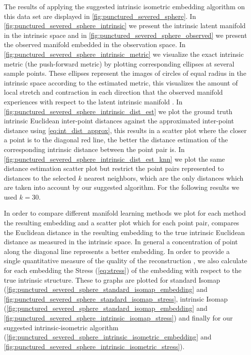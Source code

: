 	The results of applying the suggested intrinsic isometric embedding algorithm on this data set are displayed in \cref{fig:punctured_severed_sphere}. In \cref{fig:punctured_severed_sphere_intrinsic} we present the intrinsic latent manifold in the intrinsic space and in \cref{fig:punctured_severed_sphere_observed} we present the observed manifold embedded in the observation space. In \cref{fig:punctured_severed_sphere_intrinsic_metric} we visualize the exact intrinsic metric (the push-forward metric) by plotting corresponding ellipses at several sample points. These  ellipses represent the images of circles of equal radius in the intrinsic space according to the estimated metric, this visualizes the amount of local stretch and contraction in each direction that the observed manifold experiences with respect to the latent intrinsic manifold . In \cref{fig:punctured_severed_sphere_intrinsic_dist_est} we plot the ground truth intrinsic Euclidean inter-point distances against the approximated inter-point distance using \cref{eq:int_dist_approx}, this results in a scatter plot where the closer a point is to the diagonal red line, the better the distance estimation of the corresponding intrinsic distance between the point pair is. In \cref{fig:punctured_severed_sphere_intrinsic_dist_est_knn} we plot the same distance estimation scatter plot but restrict the point pairs represented to distances to the selected $k$ nearest neighbors, which are the only distances which are taken into account by our suggested algorithm. For the following results we used $k=30$. 
	
	In order to compare different manifold learning methods we plot for each method the resulting embedding and a scatter plot which for each point pair, compares the Euclidean distance in the resulting embedding to the true intrinsic Euclidean distance as measured in the intrinsic space. In general a concentration of point along the diagonal line represents a better embedding. In order to provide a single quantitative measure of the quality of the reconstruction , we also calculate for each embedding the Stress (\cref{eq:stress}) of the embedding with respect to the true intrinsic structure. These to graphs are plotted for standard Isomap (\cref{fig:punctured_severed_sphere_standard_isomap_embedding} and \cref{fig:punctured_severed_sphere_standard_isomap_stress}, intrinsic Isomap (\cref{fig:punctured_severed_sphere_standard_isomap_embedding} and \cref{fig:punctured_severed_sphere_intrinsic_isomap_stress}) and finally for our suggested intrinsic-isometric algorithm (\cref{fig:punctured_severed_sphere_intrinsic_isometric_embedding} and \cref{fig:punctured_severed_sphere_intrinsic_isometric_stress}).
	
